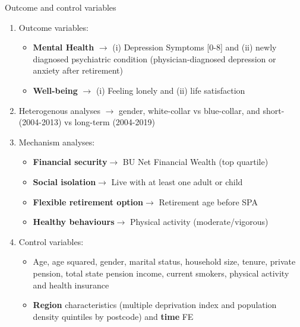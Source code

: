 \documentclass{beamer}
\begin{document}
\begin{frame}{Outcome and control variables}
\footnotesize
\begin{enumerate}

\item<1-> \begingroup\color{Blue}Outcome variables\endgroup:  

\begin{itemize}
\scriptsize
    \item<2-> \textbf{Mental Health} $\rightarrow$ (i) Depression Symptoms [0-8] and (ii) newly diagnosed psychiatric condition (physician-diagnosed depression or anxiety after retirement)

    \item<3-> \textbf{Well-being} $\rightarrow$ (i) Feeling lonely and (ii) life satisfaction
\end{itemize}

\item<4-> \begingroup\color{Blue}Heterogenous analyses \endgroup $\rightarrow$  gender, white-collar vs blue-collar, and \begingroup\color{Blue}short- (2004-2013)  \endgroup vs \begingroup\color{Blue}long-term (2004-2019) \endgroup

\item<5-> \begingroup\color{Blue}Mechanism analyses: \endgroup 

 \begin{itemize}
\scriptsize
\item<6->\textbf{Financial security}$\rightarrow$ BU Net Financial Wealth (top quartile)
\item<7-> \textbf{Social isolation}$\rightarrow$ Live with at least one adult or child 
\item<8-> \textbf{Flexible retirement option}$\rightarrow$ Retirement age before SPA
\item<9-> \textbf{Healthy behaviours}$\rightarrow$ Physical activity (moderate/vigorous)
\end{itemize}

\item<10-> \begingroup\color{Blue}Control variables\endgroup: 
 \begin{itemize}
\scriptsize
\item<11-> Age, age squared, gender, marital status, household size, tenure, private pension, total state pension income, current smokers, physical activity and health insurance

\item<12->  \textbf{Region} characteristics (multiple deprivation index and population density quintiles by postcode) and \textbf{time} FE
\end{itemize}

\end{enumerate}
\end{frame}   
\end{document}
